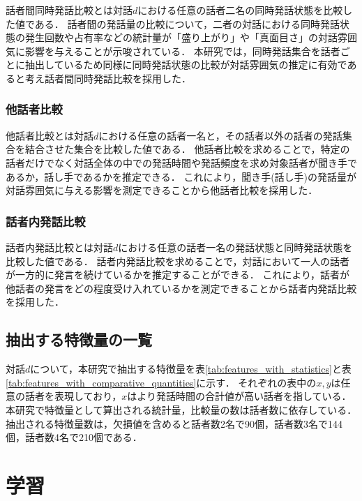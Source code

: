 話者間同時発話比較とは対話$d$における任意の話者二名の同時発話状態を比較した値である．
話者間の発話量の比較について，二者の対話における同時発話状態の発生回数や占有率などの統計量が「盛り上がり」や「真面目さ」の対話雰囲気に影響を与えることが示唆されている\cite{Ito}\cite{Toyota}．
本研究では，同時発話集合を話者ごとに抽出しているため同様に同時発話状態の比較が対話雰囲気の推定に有効であると考え話者間同時発話比較を採用した．

\subsubsection{他話者比較}

他話者比較とは対話$d$における任意の話者一名と，その話者以外の話者の発話集合を結合させた集合を比較した値である．
他話者比較を求めることで，特定の話者だけでなく対話全体の中での発話時間や発話頻度を求め対象話者が聞き手であるか，話し手であるかを推定できる．
これにより，聞き手(話し手)の発話量が対話雰囲気に与える影響を測定できることから他話者比較を採用した．

\subsubsection{話者内発話比較}

話者内発話比較とは対話$d$における任意の話者一名の発話状態と同時発話状態を比較した値である．
話者内発話比較を求めることで，対話において一人の話者が一方的に発言を続けているかを推定することができる．
これにより，話者が他話者の発言をどの程度受け入れているかを測定できることから話者内発話比較を採用した．

\subsection{抽出する特徴量の一覧}

対話$d$について，本研究で抽出する特徴量を表\ref{tab:features_with_statistics}と表\ref{tab:features_with_comparative_quantities}に示す．
それぞれの表中の$x, y$は任意の話者を表現しており，$x$はより発話時間の合計値が高い話者を指している．
本研究で特徴量として算出される統計量，比較量の数は話者数に依存している．
抽出される特徴量数は，欠損値を含めると話者数2名で90個，話者数3名で144個，話者数4名で210個である．




\section{学習\label{node:machine_learning}}


